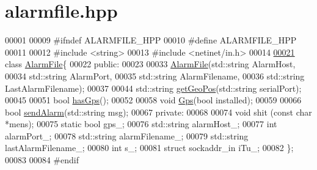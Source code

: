 \hypertarget{alarmfile_8hpp_source}{}\section{alarmfile.\+hpp}
\label{alarmfile_8hpp_source}

\begin{DoxyCode}
00001 
00009 \textcolor{preprocessor}{#ifndef ALARMFILE\_HPP}
00010 \textcolor{preprocessor}{#define ALARMFILE\_HPP}
00011 
00012 \textcolor{preprocessor}{#include <string>}
00013 \textcolor{preprocessor}{#include <netinet/in.h>}
00014 
\hyperlink{classAlarmFile}{00021} \textcolor{keyword}{class }\hyperlink{classAlarmFile}{AlarmFile}\{
00022 \textcolor{keyword}{public}:
00023 
00033   \hyperlink{classAlarmFile_ab5b7a78583764cd70d8b5b93a243439d}{AlarmFile}(std::string AlarmHost,
00034            std::string AlarmPort,
00035            std::string AlarmFilename,
00036            std::string LastAlarmFilename);
00037 
00044   std::string \hyperlink{classAlarmFile_a4865f7e404e938960e45b7e805956401}{getGeoPos}(std::string serialPort);
00045 
00051   \textcolor{keywordtype}{bool} \hyperlink{classAlarmFile_ad75728f6e44f38772372b991f21d9caa}{hasGps}();
00052 
00058   \textcolor{keywordtype}{void} \hyperlink{classAlarmFile_acfb3c406818e76439ba47aa539178f7d}{Gps}(\textcolor{keywordtype}{bool} installed);
00059 
00066   \textcolor{keywordtype}{bool} \hyperlink{classAlarmFile_a37fd701cca3c3458a3009b508383947b}{sendAlarm}(std::string msg);
00067 \textcolor{keyword}{private}:
00068 
00074   \textcolor{keywordtype}{void} shit (\textcolor{keyword}{const} \textcolor{keywordtype}{char} *mens);
00075   \textcolor{keyword}{static} \textcolor{keywordtype}{bool} gps\_; 
00076   std::string alarmHost\_; 
00077   \textcolor{keywordtype}{int} alarmPort\_; 
00078   std::string alarmFilename\_; 
00079   std::string lastAlarmFilename\_; 
00080   \textcolor{keywordtype}{int} s\_; 
00081   \textcolor{keyword}{struct }sockaddr\_in iTu\_; 
00082 \};
00083 
00084 \textcolor{preprocessor}{#endif}
\end{DoxyCode}
